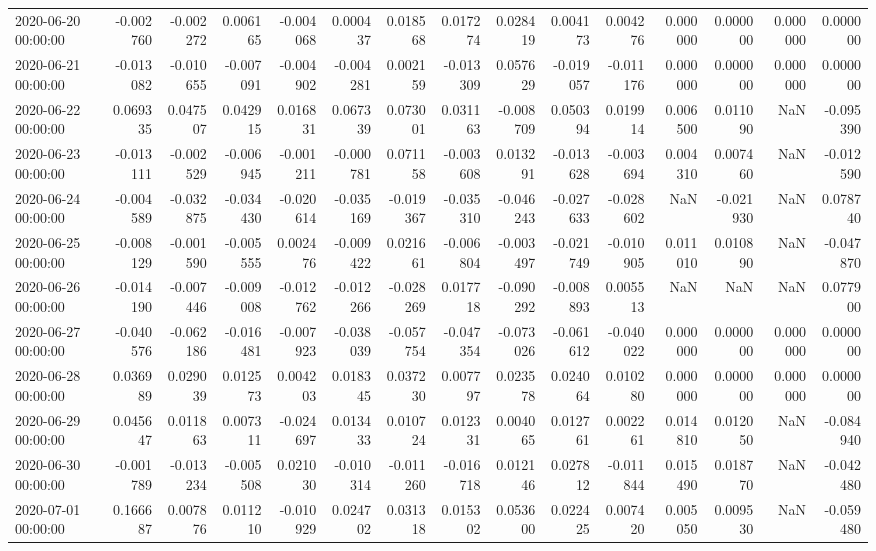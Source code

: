 \begin{tabular}{lrrrrrrrrrrrrrr}
2020-06-20 00:00:00 & -0.002760 & -0.002272 & 0.006165 & -0.004068 & 0.000437 & 0.018568 & 0.017274 & 0.028419 & 0.004173 & 0.004276 & 0.000000 & 0.000000 & 0.000000 & 0.000000 \\
2020-06-21 00:00:00 & -0.013082 & -0.010655 & -0.007091 & -0.004902 & -0.004281 & 0.002159 & -0.013309 & 0.057629 & -0.019057 & -0.011176 & 0.000000 & 0.000000 & 0.000000 & 0.000000 \\
2020-06-22 00:00:00 & 0.069335 & 0.047507 & 0.042915 & 0.016831 & 0.067339 & 0.073001 & 0.031163 & -0.008709 & 0.050394 & 0.019914 & 0.006500 & 0.011090 & NaN & -0.095390 \\
2020-06-23 00:00:00 & -0.013111 & -0.002529 & -0.006945 & -0.001211 & -0.000781 & 0.071158 & -0.003608 & 0.013291 & -0.013628 & -0.003694 & 0.004310 & 0.007460 & NaN & -0.012590 \\
2020-06-24 00:00:00 & -0.004589 & -0.032875 & -0.034430 & -0.020614 & -0.035169 & -0.019367 & -0.035310 & -0.046243 & -0.027633 & -0.028602 & NaN & -0.021930 & NaN & 0.078740 \\
2020-06-25 00:00:00 & -0.008129 & -0.001590 & -0.005555 & 0.002476 & -0.009422 & 0.021661 & -0.006804 & -0.003497 & -0.021749 & -0.010905 & 0.011010 & 0.010890 & NaN & -0.047870 \\
2020-06-26 00:00:00 & -0.014190 & -0.007446 & -0.009008 & -0.012762 & -0.012266 & -0.028269 & 0.017718 & -0.090292 & -0.008893 & 0.005513 & NaN & NaN & NaN & 0.077900 \\
2020-06-27 00:00:00 & -0.040576 & -0.062186 & -0.016481 & -0.007923 & -0.038039 & -0.057754 & -0.047354 & -0.073026 & -0.061612 & -0.040022 & 0.000000 & 0.000000 & 0.000000 & 0.000000 \\
2020-06-28 00:00:00 & 0.036989 & 0.029039 & 0.012573 & 0.004203 & 0.018345 & 0.037230 & 0.007797 & 0.023578 & 0.024064 & 0.010280 & 0.000000 & 0.000000 & 0.000000 & 0.000000 \\
2020-06-29 00:00:00 & 0.045647 & 0.011863 & 0.007311 & -0.024697 & 0.013433 & 0.010724 & 0.012331 & 0.004065 & 0.012761 & 0.002261 & 0.014810 & 0.012050 & NaN & -0.084940 \\
2020-06-30 00:00:00 & -0.001789 & -0.013234 & -0.005508 & 0.021030 & -0.010314 & -0.011260 & -0.016718 & 0.012146 & 0.027812 & -0.011844 & 0.015490 & 0.018770 & NaN & -0.042480 \\
2020-07-01 00:00:00 & 0.166687 & 0.007876 & 0.011210 & -0.010929 & 0.024702 & 0.031318 & 0.015302 & 0.053600 & 0.022425 & 0.007420 & 0.005050 & 0.009530 & NaN & -0.059480 \\

\end{tabular}
